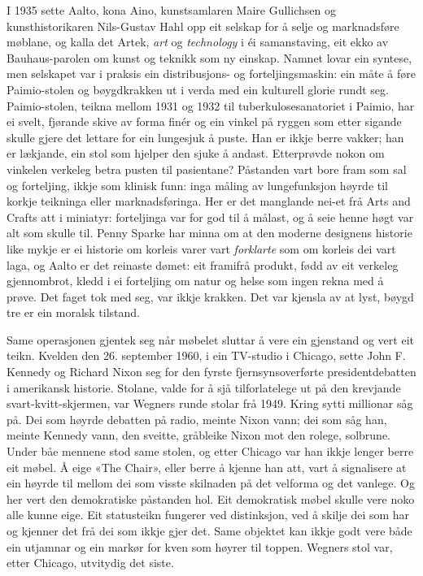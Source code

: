 I 1935 sette Aalto, kona Aino, kunstsamlaren Maire Gullichsen og kunsthistorikaren Nils-Gustav Hahl opp eit selskap for å selje og marknadsføre møblane, og kalla det Artek, \emph{art} og \emph{technology} i éi samanstaving, eit ekko av Bauhaus-parolen om kunst og teknikk som ny einskap. Namnet lovar ein syntese, men selskapet var i praksis ein distribusjons- og forteljingsmaskin: ein måte å føre Paimio-stolen og bøygdkrakken ut i verda med ein kulturell glorie rundt seg. Paimio-stolen, teikna mellom 1931 og 1932 til tuberkulosesanatoriet i Paimio, har ei svelt, fjørande skive av forma finér og ein vinkel på ryggen som etter sigande skulle gjere det lettare for ein lungesjuk å puste. Han er ikkje berre vakker; han er lækjande, ein stol som hjelper den sjuke å andast. Etterprøvde nokon om vinkelen verkeleg betra pusten til pasientane? Påstanden vart bore fram som sal og forteljing, ikkje som klinisk funn: inga måling av lungefunksjon høyrde til korkje teikninga eller marknadsføringa. Her er det manglande nei-et frå Arts and Crafts att i miniatyr: forteljinga var for god til å målast, og å seie henne høgt var alt som skulle til. Penny Sparke har minna om at den moderne designens historie like mykje er ei historie om korleis varer vart \emph{forklarte} som om korleis dei vart laga\autocite{sparke2004}, og Aalto er det reinaste dømet: eit framifrå produkt, fødd av eit verkeleg gjennombrot, kledd i ei forteljing om natur og helse som ingen rekna med å prøve. Det faget tok med seg, var ikkje krakken. Det var kjensla av at lyst, bøygd tre er ein moralsk tilstand.

Same operasjonen gjentek seg når møbelet sluttar å vere ein gjenstand og vert eit teikn. Kvelden den 26. september 1960, i ein TV-studio i Chicago, sette John F. Kennedy og Richard Nixon seg for den fyrste fjernsynsoverførte presidentdebatten i amerikansk historie. Stolane, valde for å sjå tilforlatelege ut på den krevjande svart-kvitt-skjermen, var Wegners runde stolar frå 1949. Kring sytti millionar såg på. Dei som høyrde debatten på radio, meinte Nixon vann; dei som såg han, meinte Kennedy vann, den sveitte, gråbleike Nixon mot den rolege, solbrune. Under båe mennene stod same stolen, og etter Chicago var han ikkje lenger berre eit møbel. Å eige «The Chair», eller berre å kjenne han att, vart å signalisere at ein høyrde til mellom dei som visste skilnaden på det velforma og det vanlege. Og her vert den demokratiske påstanden hol. Eit demokratisk møbel skulle vere noko alle kunne eige. Eit statusteikn fungerer ved distinksjon, ved å skilje dei som har og kjenner det frå dei som ikkje gjer det. Same objektet kan ikkje godt vere både ein utjamnar og ein markør for kven som høyrer til toppen. Wegners stol var, etter Chicago, utvitydig det siste.

